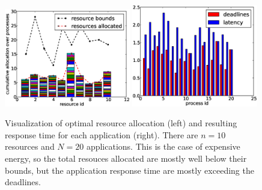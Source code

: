 \begin{figure}[th]
\centering
\includegraphics[width=0.49\textwidth]{figures/test_resource_e.eps}
\includegraphics[width=0.49\textwidth]{figures/test_latency_e.eps}
\caption{Visualization of optimal resource allocation (left) and 
    resulting response time for each application (right).
    There are $n=10$ resources and $N=20$ applications.
    This is the case of expensive energy, so the total resouces allocated
    are mostly well below their bounds, but the application response time are mostly
exceeding the deadlines.}
\label{fig:allocation-e}
\end{figure}


